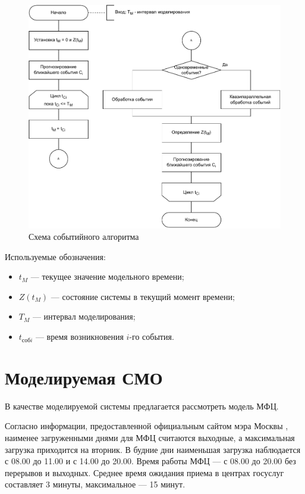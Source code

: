 \begin{figure}[h!btp]
	\centering
	\includegraphics[width=0.9\columnwidth]{inc/img/delta_z_schema.pdf}
	\caption{Схема событийного алгоритма}
	\label{img:delta_z_schema}	
\end{figure}

Используемые обозначения:
\begin{itemize}
	\item $t_M$ --- текущее значение модельного времени;
	\item $Z(t_M)$ --- состояние системы в текущий момент времени;
	\item $T_M$ --- интервал моделирования;
	\item $t_{соб i}$ --- время возникновения $i$-го события.
\end{itemize}

\section{Моделируемая СМО}
В качестве моделируемой системы предлагается рассмотреть модель МФЦ.

Согласно информации, предоставленной официальным сайтом мэра Москвы \cite{mos_ru}, наименее загруженными днями для МФЦ считаются выходные, а максимальная загрузка приходится на вторник. В будние дни наименьшая загрузка наблюдается с 08.00 до 11.00 и с 14.00 до 20.00. Время работы МФЦ --- с 08.00 до 20.00 без перерывов и выходных. Среднее время ожидания приема в центрах госуслуг составляет 3 минуты, максимальное --- 15 минут.

